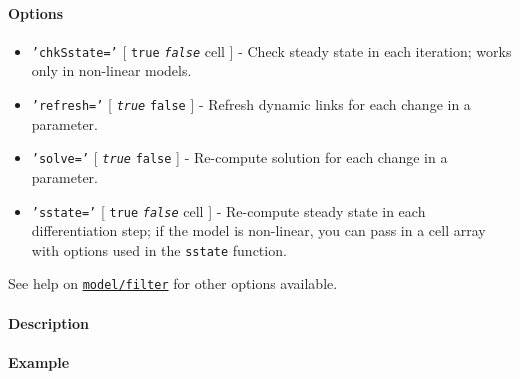 \paragraph{Options}\label{options}

\begin{itemize}
\item
  \texttt{'chkSstate='} {[} \texttt{true} \textbar{}
  \emph{\texttt{false}} \textbar{} cell {]} - Check steady state in each
  iteration; works only in non-linear models.
\item
  \texttt{'refresh='} {[} \emph{\texttt{true}} \textbar{} \texttt{false}
  {]} - Refresh dynamic links for each change in a parameter.
\item
  \texttt{'solve='} {[} \emph{\texttt{true}} \textbar{} \texttt{false}
  {]} - Re-compute solution for each change in a parameter.
\item
  \texttt{'sstate='} {[} \texttt{true} \textbar{} \emph{\texttt{false}}
  \textbar{} cell {]} - Re-compute steady state in each differentiation
  step; if the model is non-linear, you can pass in a cell array with
  options used in the \texttt{sstate} function.
\end{itemize}

See help on \href{model/filter}{\texttt{model/filter}} for other options
available.

\paragraph{Description}\label{description}

\paragraph{Example}\label{example}


